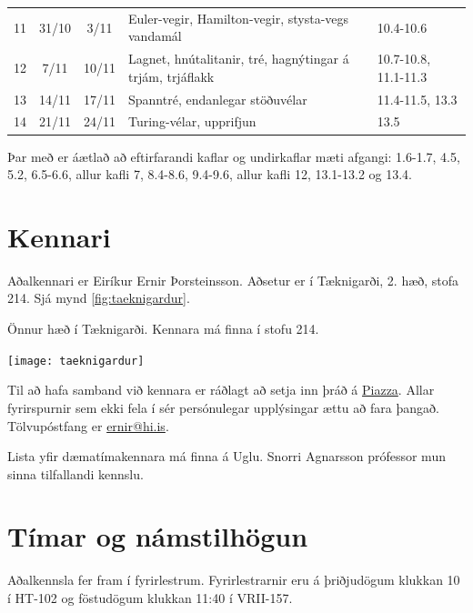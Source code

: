 \documentclass[justified, nobib]{tufte-handout}
\begin{document}
\begin{table}
\begin{center}
\begin{tabularx}{\linewidth}{lccXp{3cm}}
11	&31/10	&3/11	& Euler-vegir, Hamilton-vegir, stysta-vegs vandamál                                                     &10.4-10.6\\
12	&7/11	&10/11	& Lagnet, hnútalitanir, tré, hagnýtingar á trjám, trjáflakk                                             &10.7-10.8, 11.1-11.3\\
13	&14/11	&17/11	& Spanntré, endanlegar stöðuvélar                                                                       &11.4-11.5, 13.3\\
14	&21/11	&24/11	& Turing-vélar, upprifjun                                                                               &13.5\\
\bottomrule
\end{tabularx}
\end{center}
\end{table}

Þar með er áætlað að eftirfarandi kaflar og undirkaflar mæti afgangi: 1.6-1.7, 4.5, 5.2, 6.5-6.6, allur kafli 7, 8.4-8.6, 9.4-9.6, allur kafli 12, 13.1-13.2 og 13.4.

\section{Kennari}
Aðalkennari er Eiríkur Ernir Þorsteinsson. Aðsetur er í Tæknigarði, 2. hæð, stofa 214. Sjá mynd \ref{fig:taeknigardur}.

\begin{marginfigure}
\caption{Önnur hæð í Tæknigarði. Kennara má finna í stofu 214.}
\label{fig:taeknigardur}
\begin{center}
\texttt{[image: taeknigardur]}
\end{center}
\end{marginfigure}

Til að hafa samband við kennara er ráðlagt að setja inn þráð á \href{piazza.com/hi.is/fall2017/tl104g/home}{Piazza}. Allar fyrirspurnir sem ekki fela í sér persónulegar upplýsingar ættu að fara þangað. Tölvupóstfang er \href{mailto:ernir@hi.is}{ernir@hi.is}.

Lista yfir dæmatímakennara má finna á Uglu. Snorri Agnarsson prófessor mun sinna tilfallandi kennslu.
\section{Tímar og námstilhögun}
Aðalkennsla fer fram í fyrirlestrum. Fyrirlestrarnir eru á þriðjudögum klukkan 10 í HT-102 og föstudögum klukkan 11:40 í VRII-157.
\end{document}
